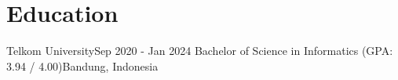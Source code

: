 \section{Education}
\resumeSubHeadingListStart
\resumeSubheading
{Telkom University}{Sep 2020 - Jan 2024}
{Bachelor of Science in Informatics (GPA: 3.94 / 4.00)}{Bandung, Indonesia}
\resumeSubHeadingListEnd